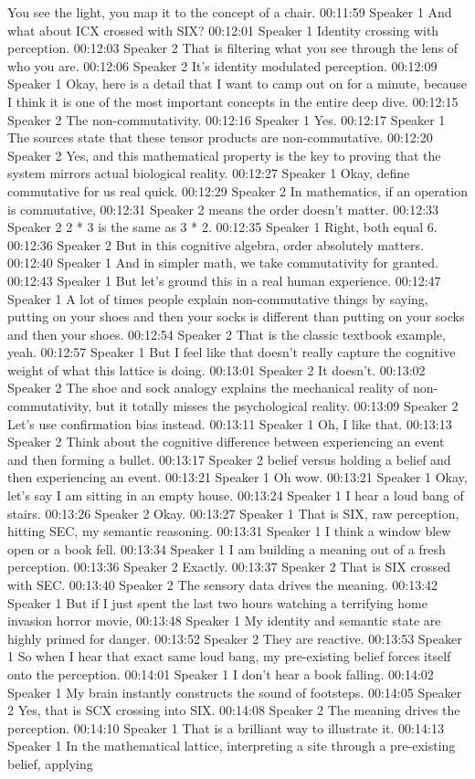 You see the light, you map it to the concept of a chair. 00:11:59 Speaker 1 And what about ICX crossed with SIX? 00:12:01 Speaker 1 Identity crossing with perception. 00:12:03 Speaker 2 That is filtering what you see through the lens of who you are. 00:12:06 Speaker 2 It's identity modulated perception. 00:12:09 Speaker 1 Okay, here is a detail that I want to camp out on for a minute, because I think it is one of the most important concepts in the entire deep dive. 00:12:15 Speaker 2 The non-commutativity. 00:12:16 Speaker 1 Yes. 00:12:17 Speaker 1 The sources state that these tensor products are non-commutative. 00:12:20 Speaker 2 Yes, and this mathematical property is the key to proving that the system mirrors actual biological reality. 00:12:27 Speaker 1 Okay, define commutative for us real quick. 00:12:29 Speaker 2 In mathematics, if an operation is commutative, 00:12:31 Speaker 2 means the order doesn't matter. 00:12:33 Speaker 2 2 * 3 is the same as 3 * 2. 00:12:35 Speaker 1 Right, both equal 6. 00:12:36 Speaker 2 But in this cognitive algebra, order absolutely matters. 00:12:40 Speaker 1 And in simpler math, we take commutativity for granted. 00:12:43 Speaker 1 But let's ground this in a real human experience. 00:12:47 Speaker 1 A lot of times people explain non-commutative things by saying, putting on your shoes and then your socks is different than putting on your socks and then your shoes. 00:12:54 Speaker 2 That is the classic textbook example, yeah. 00:12:57 Speaker 1 But I feel like that doesn't really capture the cognitive weight of what this lattice is doing. 00:13:01 Speaker 2 It doesn't. 00:13:02 Speaker 2 The shoe and sock analogy explains the mechanical reality of non-commutativity, but it totally misses the psychological reality. 00:13:09 Speaker 2 Let's use confirmation bias instead. 00:13:11 Speaker 1 Oh, I like that. 00:13:13 Speaker 2 Think about the cognitive difference between experiencing an event and then forming a bullet. 00:13:17 Speaker 2 belief versus holding a belief and then experiencing an event. 00:13:21 Speaker 1 Oh wow. 00:13:21 Speaker 1 Okay, let's say I am sitting in an empty house. 00:13:24 Speaker 1 I hear a loud bang of stairs. 00:13:26 Speaker 2 Okay. 00:13:27 Speaker 1 That is SIX, raw perception, hitting SEC, my semantic reasoning. 00:13:31 Speaker 1 I think a window blew open or a book fell. 00:13:34 Speaker 1 I am building a meaning out of a fresh perception. 00:13:36 Speaker 2 Exactly. 00:13:37 Speaker 2 That is SIX crossed with SEC. 00:13:40 Speaker 2 The sensory data drives the meaning. 00:13:42 Speaker 1 But if I just spent the last two hours watching a terrifying home invasion horror movie, 00:13:48 Speaker 1 My identity and semantic state are highly primed for danger. 00:13:52 Speaker 2 They are reactive. 00:13:53 Speaker 1 So when I hear that exact same loud bang, my pre-existing belief forces itself onto the perception. 00:14:01 Speaker 1 I don't hear a book falling. 00:14:02 Speaker 1 My brain instantly constructs the sound of footsteps. 00:14:05 Speaker 2 Yes, that is SCX crossing into SIX. 00:14:08 Speaker 2 The meaning drives the perception. 00:14:10 Speaker 1 That is a brilliant way to illustrate it. 00:14:13 Speaker 1 In the mathematical lattice, interpreting a site through a pre-existing belief, applying 